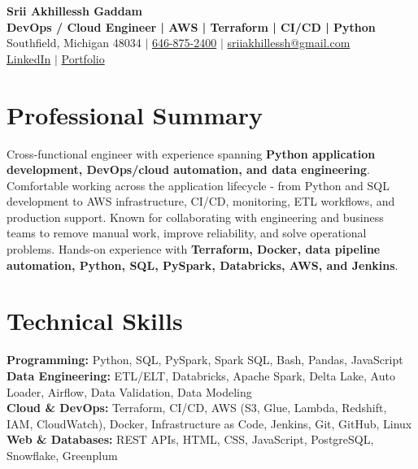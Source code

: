 \documentclass[letterpaper,10pt]{article}
\begin{document}
\fontsize{9.35pt}{10.45pt}\selectfont

\begin{center}
    {\LARGE \textbf{Srii Akhillessh Gaddam}} \\[-1pt]
    \textbf{DevOps / Cloud Engineer | AWS | Terraform | CI/CD | Python} \\[2pt]
    Southfield, Michigan 48034 $|$
    \href{tel:6468752400}{646-875-2400} $|$
    \href{mailto:sriiakhillessh@gmail.com}{sriiakhillessh@gmail.com} \\[1pt]
    \href{https://www.linkedin.com/in/srii-akhiilessh-gaddam-b48668191/}{LinkedIn} $|$
    \href{https://sriiakhillesshg.github.io/portfolio/}{Portfolio}
\end{center}
\vspace{-8pt}

\section{Professional Summary}
\small{Cross-functional engineer with experience spanning \textbf{Python application development, DevOps/cloud automation, and data engineering}. Comfortable working across the application lifecycle - from Python and SQL development to AWS infrastructure, CI/CD, monitoring, ETL workflows, and production support. Known for collaborating with engineering and business teams to remove manual work, improve reliability, and solve operational problems. Hands-on experience with \textbf{Terraform, Docker, data pipeline automation, Python, SQL, PySpark, Databricks, AWS, and Jenkins}.}

\section{Technical Skills}
\small{
\textbf{Programming:} Python, SQL, PySpark, Spark SQL, Bash, Pandas, JavaScript \\
\textbf{Data Engineering:} ETL/ELT, Databricks, Apache Spark, Delta Lake, Auto Loader, Airflow, Data Validation, Data Modeling \\
\textbf{Cloud \& DevOps:} Terraform, CI/CD, AWS (S3, Glue, Lambda, Redshift, IAM, CloudWatch), Docker, Infrastructure as Code, Jenkins, Git, GitHub, Linux \\
\textbf{Web \& Databases:} REST APIs, HTML, CSS, JavaScript, PostgreSQL, Snowflake, Greenplum
}
\end{document}
